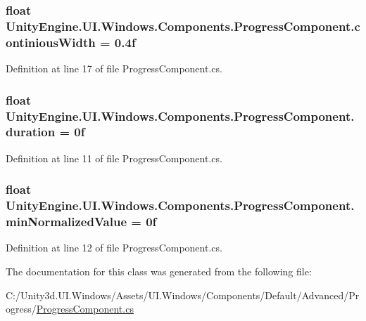 \subsubsection[{continious\+Width}]{\setlength{\rightskip}{0pt plus 5cm}float Unity\+Engine.\+U\+I.\+Windows.\+Components.\+Progress\+Component.\+continious\+Width = 0.\+4f}\label{class_unity_engine_1_1_u_i_1_1_windows_1_1_components_1_1_progress_component_af70cf7358cf9773fadc7ac61cfc0d514}


Definition at line 17 of file Progress\+Component.\+cs.

\hypertarget{class_unity_engine_1_1_u_i_1_1_windows_1_1_components_1_1_progress_component_a66a027327d9cde90ec6ea763353f0659}{}
\subsubsection[{duration}]{\setlength{\rightskip}{0pt plus 5cm}float Unity\+Engine.\+U\+I.\+Windows.\+Components.\+Progress\+Component.\+duration = 0f}\label{class_unity_engine_1_1_u_i_1_1_windows_1_1_components_1_1_progress_component_a66a027327d9cde90ec6ea763353f0659}


Definition at line 11 of file Progress\+Component.\+cs.

\hypertarget{class_unity_engine_1_1_u_i_1_1_windows_1_1_components_1_1_progress_component_a4e4956ed8586fd6d47fe91596d95ce8f}{}
\subsubsection[{min\+Normalized\+Value}]{\setlength{\rightskip}{0pt plus 5cm}float Unity\+Engine.\+U\+I.\+Windows.\+Components.\+Progress\+Component.\+min\+Normalized\+Value = 0f}\label{class_unity_engine_1_1_u_i_1_1_windows_1_1_components_1_1_progress_component_a4e4956ed8586fd6d47fe91596d95ce8f}


Definition at line 12 of file Progress\+Component.\+cs.



The documentation for this class was generated from the following file\+:\begin{DoxyCompactItemize}
\item 
C\+:/\+Unity3d.\+U\+I.\+Windows/\+Assets/\+U\+I.\+Windows/\+Components/\+Default/\+Advanced/\+Progress/\hyperlink{_progress_component_8cs}{Progress\+Component.\+cs}\end{DoxyCompactItemize}
